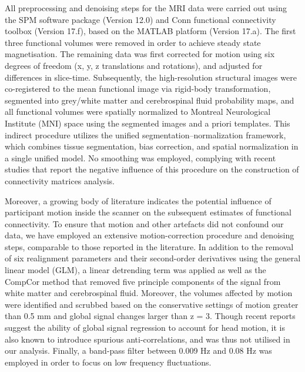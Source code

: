 All preprocessing and denoising steps for the MRI data were carried out using the SPM software package (Version 12.0) and Conn functional connectivity toolbox (Version 17.f), based on the MATLAB platform (Version 17.a). The first three functional volumes were removed in order to achieve steady state magnetisation. The remaining data was first corrected for motion using six degrees of freedom (x, y, z translations and rotations), and adjusted for differences in slice-time. Subsequently, the high-resolution structural images were co-registered to the mean functional image via rigid-body transformation, segmented into grey/white matter and cerebrospinal fluid probability maps, and all functional volumes were spatially normalized to Montreal Neurological Institute (MNI) space using the segmented images and a priori templates. This indirect procedure utilizes the unified segmentation–normalization framework, which combines tissue segmentation, bias correction, and spatial normalization in a single unified model. No smoothing was employed, complying with recent studies that report the negative influence of this procedure on the construction of connectivity matrices analysis. 

Moreover, a growing body of literature indicates the potential influence of participant motion inside the scanner on the subsequent estimates of functional connectivity. To ensure that motion and other artefacts did not confound our data, we have employed an extensive motion-correction procedure and denoising steps, comparable to those reported in the literature. In addition to the removal of six realignment parameters and their second-order derivatives using the general linear model (GLM), a linear detrending term was applied as well as the CompCor method that removed five principle components of the signal from white matter and cerebrospinal fluid. Moreover, the volumes affected by motion were identified and scrubbed based on the conservative settings of motion greater than 0.5 mm and global signal changes larger than z = 3. Though recent reports suggest the ability of global signal regression to account for head motion, it is also known to introduce spurious anti-correlations, and was thus not utilised in our analysis. Finally, a band-pass filter between 0.009 Hz and 0.08 Hz was employed in order to focus on low frequency fluctuations.

